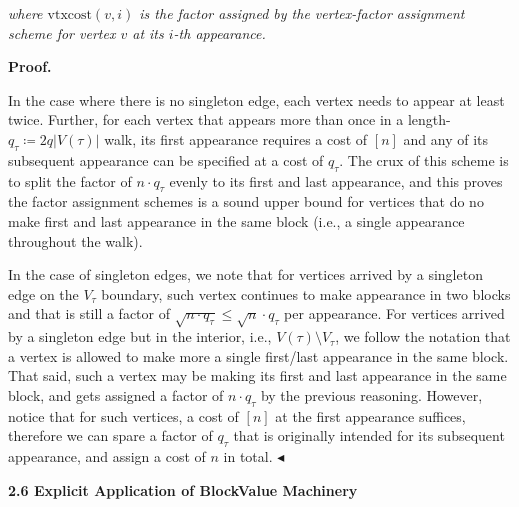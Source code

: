 \emph{where $\text{vtxcost}(v,i)$ is the factor assigned by the vertex-factor assignment scheme for vertex $v$ at its $i$-th appearance.}\par






\par\medskip\noindent\textbf{Proof.}\par




In the case where there is no singleton edge, each vertex needs to appear at least twice. Further, for each vertex that appears more than once in a length-$q_{\tau}\coloneqq 2q|V(\tau)|$ walk, its first appearance requires a cost of $[n]$ and any of its subsequent appearance can be specified at a cost of $q_{\tau}$. The crux of this scheme is to split the factor of $n\cdot q_{\tau}$ evenly to its first and last appearance, and this proves the factor assignment schemes is a sound upper bound for vertices that do no make first and last appearance in the same block (i.e., a single appearance throughout the walk).\par




In the case of singleton edges, we note that for vertices arrived by a singleton edge on the $V_{\tau}$ boundary, such vertex continues to make appearance in two blocks and that is still a factor of $\sqrt{n\cdot q_{\tau}}\leq\sqrt{n}\cdot q_{\tau}$ per appearance. For vertices arrived by a singleton edge but in the interior, i.e., $V(\tau)\setminus V_{\tau}$, we follow the notation that a vertex is allowed to make more a single first/last appearance in the same block. That said, such a vertex may be making its first and last appearance in the same block, and gets assigned a factor of $n\cdot q_{\tau}$ by the previous reasoning. However, notice that for such vertices, a cost of $[n]$ at the first appearance suffices, therefore we can spare a factor of $q_{\tau}$ that is originally intended for its subsequent appearance, and assign a cost of $n$ in total.
$\blacktriangleleft$\par







\par\medskip\noindent\textbf{
2.6 Explicit Application of BlockValue Machinery}\par




